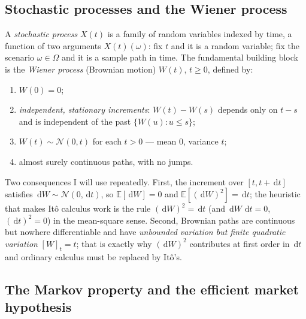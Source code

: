 \documentclass[11pt]{article}
\newcommand{\E}{\mathbb{E}}
\newcommand{\dd}{\,\mathrm{d}}
\begin{document}
\subsection{Stochastic processes and the Wiener process}

A \emph{stochastic process} $X(t)$ is a family of random variables indexed by time, a function of two arguments $X(t)(\omega)$: fix $t$ and it is a random variable; fix the scenario $\omega\in\Omega$ and it is a sample path in time. The fundamental building block is the \emph{Wiener process} (Brownian motion) $W(t)$, $t\ge0$, defined by:
\begin{enumerate}[nosep,label=(\roman*)]
\item $W(0)=0$;
\item \emph{independent, stationary increments}: $W(t)-W(s)$ depends only on $t-s$ and is independent of the past $\{W(u):u\le s\}$;
\item $W(t)\sim\mathcal{N}(0,t)$ for each $t>0$ --- mean $0$, variance $t$;
\item almost surely continuous paths, with no jumps.
\end{enumerate}
Two consequences I will use repeatedly. First, the increment over $[t,t+\dd t]$ satisfies $\dd W\sim\mathcal{N}(0,\dd t)$, so $\E[\dd W]=0$ and $\E[(\dd W)^2]=\dd t$; the heuristic that makes It\^o calculus work is the rule $(\dd W)^2=\dd t$ (and $\dd W\,\dd t=0$, $(\dd t)^2=0$) in the mean-square sense. Second, Brownian paths are continuous but nowhere differentiable and have \emph{unbounded variation but finite quadratic variation} $[W]_t=t$; that is exactly why $(\dd W)^2$ contributes at first order in $\dd t$ and ordinary calculus must be replaced by It\^o's.

\subsection{The Markov property and the efficient market hypothesis}
\end{document}
